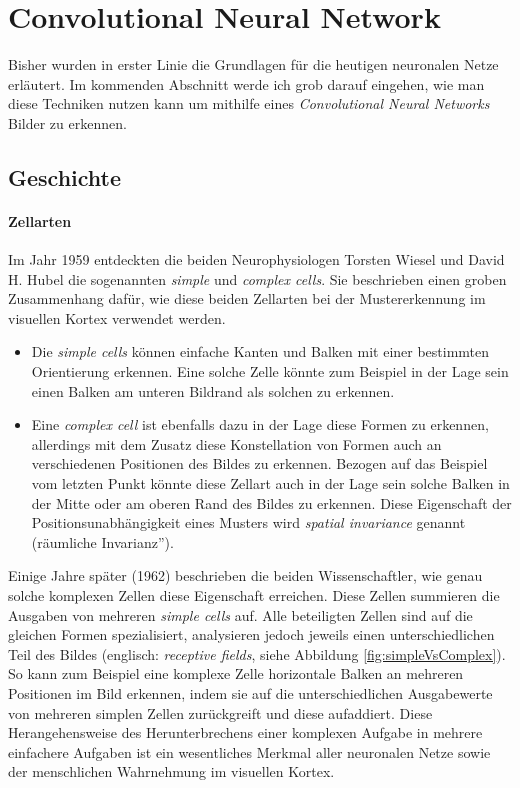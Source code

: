 \section{Convolutional Neural Network} \label{sc:cnn}
Bisher wurden in erster Linie die Grundlagen für die heutigen neuronalen Netze erläutert. Im kommenden Abschnitt werde ich grob darauf eingehen, wie man diese Techniken nutzen kann um mithilfe eines \emph{Convolutional Neural Networks} Bilder zu erkennen. 


\subsection{Geschichte}

\paragraph{Zellarten} 
Im Jahr 1959 entdeckten die beiden Neurophysiologen Torsten Wiesel und David H. Hubel die sogenannten \emph{simple} und \emph{complex cells}. Sie beschrieben einen groben Zusammenhang dafür, wie diese beiden Zellarten bei der Mustererkennung im visuellen Kortex verwendet werden. 

\begin{itemize}
\item Die \emph{simple cells} können einfache Kanten und Balken mit einer bestimmten Orientierung erkennen. Eine solche Zelle könnte zum Beispiel in der Lage sein einen Balken am unteren Bildrand als solchen zu erkennen. 

\item Eine \emph{complex cell} ist ebenfalls dazu in der Lage diese Formen zu erkennen, allerdings mit dem Zusatz diese Konstellation von Formen auch an verschiedenen Positionen des Bildes zu erkennen. Bezogen auf das Beispiel vom letzten Punkt könnte diese Zellart auch in der Lage sein solche Balken in der Mitte oder am oberen Rand des Bildes zu erkennen. Diese Eigenschaft der Positionsunabhängigkeit eines Musters wird \emph{spatial invariance} genannt (\glqq räumliche Invarianz'').
\end{itemize}

Einige Jahre später (1962) beschrieben die beiden Wissenschaftler, wie genau solche komplexen Zellen diese Eigenschaft erreichen. Diese Zellen summieren die Ausgaben von mehreren \emph{simple cells} auf. Alle beteiligten Zellen sind auf die gleichen Formen spezialisiert, analysieren jedoch jeweils einen unterschiedlichen Teil des Bildes (englisch: \emph{receptive fields}, siehe Abbildung \ref{fig:simpleVsComplex}). So kann zum Beispiel eine komplexe Zelle horizontale Balken an mehreren Positionen im Bild erkennen, indem sie auf die unterschiedlichen Ausgabewerte von mehreren simplen Zellen zurückgreift und diese aufaddiert. Diese Herangehensweise des Herunterbrechens einer komplexen Aufgabe in mehrere einfachere Aufgaben ist ein wesentliches Merkmal aller neuronalen Netze sowie der menschlichen Wahrnehmung im visuellen Kortex. 

